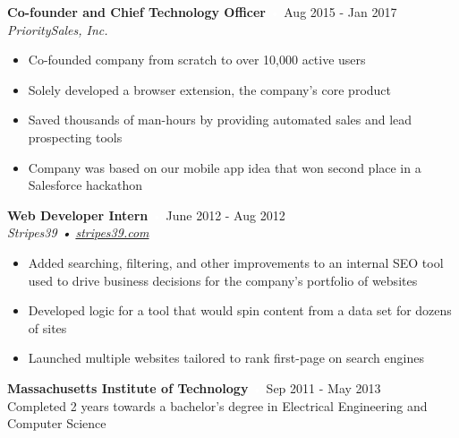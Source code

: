 \documentclass{resume}
\begin{document}
\textbf{Co-founder and Chief Technology Officer}
\hfill{\textcolor{white}{•} Aug 2015 - Jan 2017}\\
\textit{PrioritySales, Inc.}

\nointerlineskip
\begin{itemize}
	\item Co-founded company from scratch to over 10,000 active users
	\item Solely developed a browser extension, the company's core product
	\item Saved thousands of man-hours by providing automated sales and lead prospecting tools
	\item Company was based on our mobile app idea that won second place in a Salesforce hackathon
\end{itemize}

\textbf{Web Developer Intern}
\hfill{\textcolor{white}{•} June 2012 - Aug 2012}\\
\textit{Stripes39 • \href{https://www.stripes39.com}{stripes39.com}}

\nointerlineskip
\begin{itemize}
	\item Added searching, filtering, and other improvements to an internal SEO tool used to drive business decisions for the company's portfolio of websites
	\item Developed logic for a tool that would spin content from a data set for dozens of sites
	\item Launched multiple websites tailored to rank first-page on search engines
\end{itemize}

\bigskip

\colorbox{headerbg3}{\hspace{\linewidth}\hspace{-2\fboxsep}}

\textbf{Massachusetts Institute of Technology}
\hfill{\textcolor{white}{•} Sep 2011 - May 2013}\\
Completed 2 years towards a bachelor's degree in Electrical Engineering and Computer Science
\end{document}
